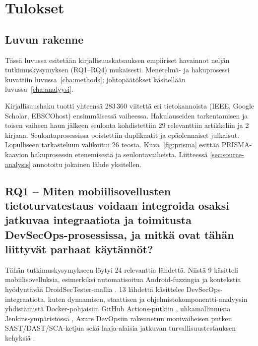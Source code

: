 \documentclass[bscthesis,finnish,oneside,biblatex]{uefcsthesis}
\begin{document}


    \chapter{Tulokset}
    \label{cha:tulokset}



    \section*{Luvun rakenne}
    Tässä luvussa esitetään kirjallisuuskatsauksen empiiriset havainnot neljän tutkimuskysymyksen (RQ1–RQ4) mukaisesti. Menetelmä- ja hakuprosessi kuvattiin luvussa~\ref{cha:methods}; johtopäätökset käsitellään luvussa~\ref{cha:analyysi}.

    Kirjallisuushaku tuotti yhteensä 283\,360 viitettä eri tietokannoista (IEEE, Google Scholar, EBSCOhost) ensimmäisessä vaiheessa. Hakulauseiden tarkentamisen ja toisen vaiheen haun jälkeen seulonta kohdistettiin 29 relevanttiin artikkeliin ja 2 kirjaan. Seulontaprosessissa poistettiin duplikaatit ja epäolennaiset julkaisut. Lopulliseen tarkasteluun valikoitui 26 teosta. Kuva~\ref{fig:prisma} esittää PRISMA-kaavion hakuprosessin etenemisestä ja seulontavaiheista. Liitteessä \ref{sec:source-analysis} annotoitu jokainen lähde yksitellen.



    \section{RQ1 – Miten mobiilisovellusten tietoturvatestaus voidaan integroida osaksi jatkuvaa integraatiota ja toimitusta DevSecOps-prosessissa, ja mitkä ovat tähän liittyvät parhaat käytännöt?}
    \label{sec:rq1}

    Tähän tutkimuskysymykseen löytyi 24 relevanttia lähdettä. Niistä 9 käsitteli mobiilisovelluksia, esimerkiksi automatisoitua Android-fuzzingia \cite{schneider_2020_fuzzing} ja kontekstia hyödyntävää DroidSecTester-mallia \cite{baheux2023_droidsectester}. 13 lähdettä käsittelee DevSecOps-integraatiota, kuten dynaamisen, staattisen ja ohjelmistokomponentti-analyysin yhdistämistä Docker-pohjaisiin GitHub Actions-putkiin \cite{marandi2023_ias}, uhkamallinnusta Jenkins-ympäristössä \cite{nikolov2024_fit}, Azure DevOpsiin rakennetun monivaiheisen putken SAST/DAST/SCA-ketjua \cite{kushwaha2024_cct} sekä laaja-alaisia jatkuvan turvallisuustestauksen kehyksiä \cite{feio2024_empirical,aljohani2023_automating}.
\end{document}
